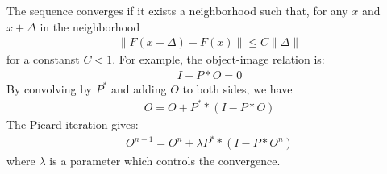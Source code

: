 \documentclass[11pt,a4paper]{article}
\newcommand{\be}{\begin{eqnarray}}
\newcommand{\ee}{\end{eqnarray}}
\begin{document}
The sequence converges if it exists a neighborhood such that,
for any $x$ and $x + \Delta$ in the neighborhood
\be
 \parallel F(x+ \Delta) - F(x) \parallel \le C \parallel \Delta \parallel 
\ee
for a constanst $C < 1$.
For example, the object-image relation is:
\be
I - P*O = 0
\ee
By convolving by $P^*$ and adding $O$ to both sides, we have
\be
O  = O + P^* * (I - P*O)
\ee
The Picard iteration gives:
\be
O^{n+1}  = O^{n} + \lambda P^* * (I - P*O^{n})
\ee
where $\lambda$ is a parameter which controls the convergence.

\newpage

\newpage

\end{document}
